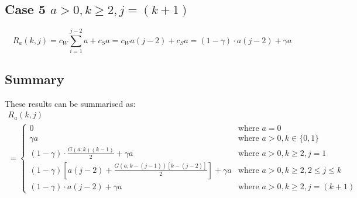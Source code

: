 \subsection{Case 5 $a > 0, k \geq 2, j = (k + 1)$}
\begin{equation*}
	R_{a} (k, j) = c_{W} \sum_{i = 1}^{j - 2} a + c_{S} a = c_{W} a (j - 2) + c_{S} a = (1 - \gamma) \cdot a (j - 2) + \gamma a
\end{equation*}

\subsection{Summary}
These results can be summarised as:
\begin{multline}
	R_{a} (k, j) \\
	= \begin{cases}
		0 & \text{where $a = 0$} \\
		\gamma a & \text{where $a > 0, k \in \{ 0, 1 \}$} \\
		(1 - \gamma) \cdot \frac{G (a; k) (k - 1)}{2} + \gamma a & \text{where $a > 0, k \geq 2, j = 1$} \\
		(1 - \gamma) \left[ a (j - 2) + \frac{G (a; k - (j - 1)) [k - (j - 2)]}{2} \right] + \gamma a & 	\text{where $a > 0, k \geq 2, 2 \leq j \leq k$} \\
		(1 - \gamma) \cdot a (j - 2) + \gamma a & \text{where $a > 0, k \geq 2, j = (k + 1)$}
	\end{cases}
\end{multline}

















































